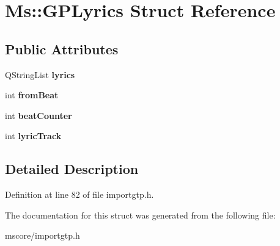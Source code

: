 \hypertarget{struct_ms_1_1_g_p_lyrics}{}\section{Ms\+:\+:G\+P\+Lyrics Struct Reference}
\label{struct_ms_1_1_g_p_lyrics}
\subsection*{Public Attributes}
\begin{DoxyCompactItemize}
\item 
\mbox{\label{struct_ms_1_1_g_p_lyrics_a1ab42a953830d4b4f468dab630bdd3dd}} 
Q\+String\+List {\bfseries lyrics}
\item 
\mbox{\label{struct_ms_1_1_g_p_lyrics_a548949cda0ca1f0d1a26ba6966e6048e}} 
int {\bfseries from\+Beat}
\item 
\mbox{\label{struct_ms_1_1_g_p_lyrics_a9570cbd9943dfc983f360cb99b0b2698}} 
int {\bfseries beat\+Counter}
\item 
\mbox{\label{struct_ms_1_1_g_p_lyrics_abf0709949053297c6926df783bb368e2}} 
int {\bfseries lyric\+Track}
\end{DoxyCompactItemize}


\subsection{Detailed Description}


Definition at line 82 of file importgtp.\+h.



The documentation for this struct was generated from the following file\+:\begin{DoxyCompactItemize}
\item 
mscore/importgtp.\+h\end{DoxyCompactItemize}
